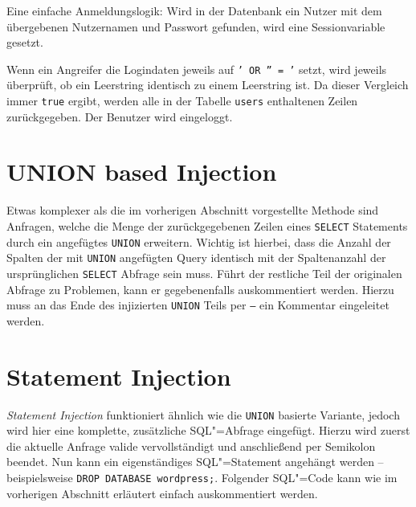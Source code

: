 \begin{listing}
\begin{margincap}
\inputminted[startinline,obeytabs]{php}{imports/login_1.php}
\caption{Eine einfache Anmeldungslogik: Wird in der Datenbank ein Nutzer mit dem übergebenen Nutzernamen und Passwort gefunden, wird eine Sessionvariable gesetzt. }
\label{lst:login_query}
\end{margincap}
\end{listing}

Wenn ein Angreifer die Logindaten jeweils auf \texttt{' OR '' = '} setzt, wird jeweils überprüft, ob ein Leerstring identisch zu einem Leerstring ist. Da dieser Vergleich immer \texttt{true} ergibt, werden alle in der Tabelle \texttt{users} enthaltenen Zeilen zurückgegeben. Der Benutzer wird eingeloggt.

\section{UNION based Injection}

Etwas komplexer als die im vorherigen Abschnitt vorgestellte Methode sind Anfragen, welche die Menge der zurückgegebenen Zeilen eines \texttt{SELECT} Statements durch ein angefügtes \texttt{UNION} erweitern. Wichtig ist hierbei, dass die Anzahl der Spalten der mit \texttt{UNION} angefügten Query identisch mit der Spaltenanzahl der ursprünglichen  \texttt{SELECT} Abfrage sein muss. Führt der restliche Teil der originalen Abfrage zu Problemen, kann er gegebenenfalls auskommentiert werden. Hierzu muss an das Ende des injizierten \texttt{UNION} Teils per \texttt{--} ein Kommentar eingeleitet werden.


\section{Statement Injection}

\emph{Statement Injection } funktioniert ähnlich wie die \texttt{UNION} basierte Variante, jedoch wird hier eine komplette, zusätzliche SQL"=Abfrage eingefügt. Hierzu wird zuerst die aktuelle Anfrage valide vervollständigt und anschließend per Semikolon beendet. Nun kann ein eigenständiges SQL"=Statement angehängt werden -- beispielsweise \texttt{DROP DATABASE wordpress;}. Folgender SQL"=Code kann wie im vorherigen Abschnitt erläutert einfach auskommentiert werden.


